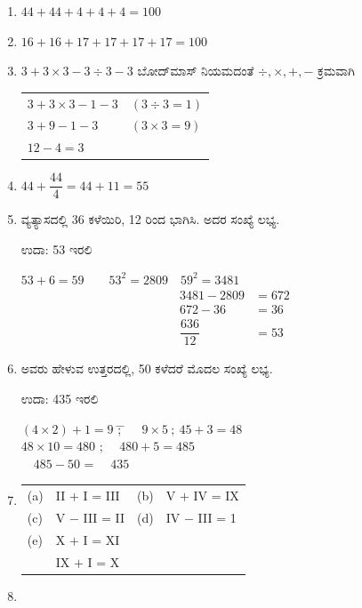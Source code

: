 \begin{enumerate}
\itemsep=5pt

\item $44+44+4+4+4 = 100$

\item $16+16+17+17+17+17 = 100$

\item $3+3\times 3 - 3 \div 3 - 3$ ಬೋದ್‌ಮಾಸ್ ನಿಯಮದಂತೆ $\div, \times, +, -$ ಕ್ರಮವಾಗಿ

\begin{tabular}[t]{ll}
$3+3\times 3 - 1 - 3$ & $(3 \div 3 = 1)$\\
$3+9 - 1 - 3$ & $(3 \times 3 = 9)$\\
$12 - 4 = 3$ & 
\end{tabular}

\item $44 + \dfrac{44}{4} = 44 + 11 = 55$

\item ವ್ಯತ್ಯಾಸದಲ್ಲಿ 36 ಕಳೆಯಿರಿ, 12 ರಿಂದ ಭಾಗಿಸಿ. ಅದರ ಸಂಖ್ಯೆ ಲಭ್ಯ. 

ಉದಾ: 53 ಇರಲಿ 

$53 + 6 =  59 \qquad 53^{2} = 2809 \quad 59^{2} = 3481$
\begin{align*}
3481 - 2809 & = 672\\
672 - 36 & = 36\\
\dfrac{636}{12} & = 53
\end{align*}

\item ಅವರು ಹೇಳುವ ಉತ್ತರದಲ್ಲಿ, 50 ಕಳೆದರೆ ಮೊದಲ ಸಂಖ್ಯೆ ಲಭ್ಯ. 

ಉದಾ: 435 ಇರಲಿ 
{\fontsize{11pt}{13pt}\selectfont
\begin{tabbing}
$(4\times 2) + 1 = 9$ \= ; \= $\quad 9\times 5 ~;~  45+3 = 48$\\
$48\times 10 = 480$ \> ; \> $\quad 480 + 5 = 485$\\
$\quad485 - 50$ \> = \> $\quad 435$
\end{tabbing}}\relax

\item
\begin{tabular}[t]{llll}
(a)& II $+$ I = III & (b)& V $+$ IV = IX\\
(c)& V $-$ III = II &(d)& IV $-$ III = 1\\
(e)& X $+$ I = XI & & \\
& IX $+$ I = X & &
\end{tabular}

\item 
~


\end{enumerate}
